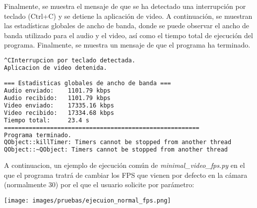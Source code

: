 Finalmente, se muestra el mensaje de que se ha detectado una interrupción por teclado (Ctrl+C) y se detiene la aplicación de video. A continuación, se muestran las estadísticas globales de ancho de banda, donde se puede observar el ancho de banda utilizado para el audio y el video, así como el tiempo total de ejecución del programa. Finalmente, se muestra un mensaje de que el programa ha terminado.
\begin{lstlisting}[language=bash,basicstyle=\ttfamily\scriptsize]
^CInterrupcion por teclado detectada.
Aplicacion de video detenida.

=== Estadisticas globales de ancho de banda ===
Audio enviado:    1101.79 kbps
Audio recibido:   1101.79 kbps
Video enviado:    17335.16 kbps
Video recibido:   17334.68 kbps
Tiempo total:     23.4 s
=======================================================
Programa terminado.
QObject::killTimer: Timers cannot be stopped from another thread
QObject::~QObject: Timers cannot be stopped from another thread
\end{lstlisting}
\vspace{\baselineskip}

A continuacion, un ejemplo de ejecución común de \textit{minimal\_video\_fps.py} en el que el programa tratrá de cambiar los FPS que vienen por defecto en la cámara (normalmente 30) por el que el usuario solicite por parámetro:
\begin{center}
	\texttt{[image: images/pruebas/ejecuion\_normal\_fps.png]}
	\label{fig:ejecucion_fps}
\end{center}
\vspace{\baselineskip}

